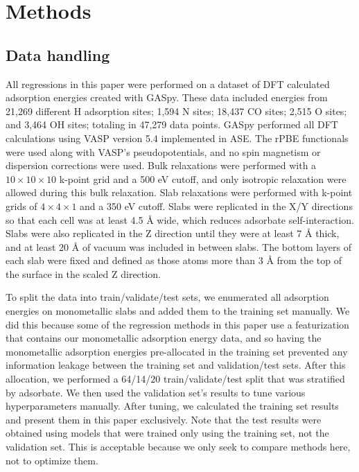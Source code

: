 \documentclass[]{achemso}
\begin{document}

\section{Methods}

\subsection{Data handling}

All regressions in this paper were performed on a dataset of \gls{DFT} calculated adsorption energies created with \gls{GASpy}\cite{Tran2018, Tran2018a}.
These data included energies from 21,269 different H adsorption sites; 1,594 N sites; 18,437 CO sites; 2,515 O sites; and 3,464 OH sites; totaling in 47,279 data points.
\gls{GASpy} performed all \gls{DFT} calculations using \gls{VASP}\cite{Kresse1993, Kresse1994, Kresse1996, Kresse1996a} version 5.4 implemented in \gls{ASE}\cite{HjorthLarsen2017}.
The \gls{rPBE} functionals\cite{Hammer1999} were used along with \gls{VASP}'s pseudopotentials, and no spin magnetism or dispersion corrections were used.
Bulk relaxations were performed with a $10\times10\times10$ k-point grid and a 500 \gls{eV} cutoff, and only isotropic relaxation were allowed during this bulk relaxation.
Slab relaxations were performed with k-point grids of $4\times4\times1$ and a 350 \gls{eV} cutoff.
Slabs were replicated in the X/Y directions so that each cell was at least 4.5 \AA{} wide, which reduces adsorbate self-interaction.
Slabs were also replicated in the Z direction until they were at least 7 \AA{} thick, and at least 20 \AA{} of vacuum was included in between slabs.
The bottom layers of each slab were fixed and defined as those atoms more than 3 \AA{} from the top of the surface in the scaled Z direction.

To split the data into train/validate/test sets, we enumerated all adsorption energies on monometallic slabs and added them to the training set manually. 
We did this because some of the regression methods in this paper use a featurization that contains our monometallic adsorption energy data\cite{Tran2018}, and so having the monometallic adsorption energies pre-allocated in the training set prevented any information leakage between the training set and validation/test sets.
After this allocation, we performed a 64/14/20 train/validate/test split that was stratified\cite{Thompson2012} by adsorbate.
We then used the validation set's results to tune various hyperparameters manually.
After tuning, we calculated the training set results and present them in this paper exclusively.
Note that the test results were obtained using models that were trained only using the training set, not the validation set.
This is acceptable because we only seek to compare methods here, not to optimize them.
\end{document}
